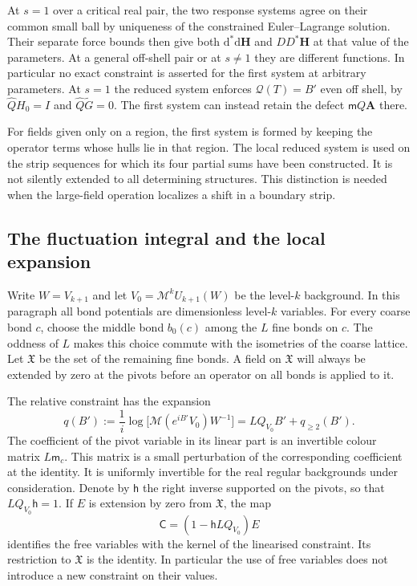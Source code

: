 \documentclass[11pt,letterpaper,reqno]{amsart}
\theoremstyle{definition}
\theoremstyle{remark}
\begin{document}
At $s=1$ over a critical real pair,
the two response systems agree on
their common small ball by uniqueness
of the constrained Euler--Lagrange
solution. Their separate force bounds
then give both $\mathrm d^*\mathrm d\mathbf H$ and
$DD^*\mathbf H$ at that value of the
parameters. At a general off-shell
pair or at $s\ne1$ they are different
functions. In particular no exact
constraint is asserted for the first
system at arbitrary parameters.
At $s=1$ the reduced system enforces
$\mathcal Q(T)=B'$ even off shell,
by $\widehat QH_0=I$ and
$\widehat Q\widetilde G=0$. The
first system can instead retain the
defect $\mathsf mQ\mathbf A$ there.

For fields given only on a region,
the first system is formed by keeping
the operator terms whose hulls lie
in that region. The local reduced
system is used on the strip sequences
for which its four partial sums
have been constructed. It is not
silently extended to all determining
structures. This distinction is
needed when the large-field operation
localizes a shift in a boundary strip.

\subsection{The fluctuation integral and the local expansion}

Write $W=V_{k+1}$ and let $V_0=\mathcal M^kU_{k+1}(W)$ be the
level-$k$ background. In this paragraph all bond potentials are
dimensionless level-$k$ variables. For every coarse bond $c$, choose
the middle bond $b_0(c)$ among the $L$ fine bonds on $c$. The oddness
of $L$ makes this choice commute with the isometries of the coarse
lattice. Let $\mathfrak X$ be the set of the remaining fine bonds.
A field on $\mathfrak X$ will always be extended by zero at the
pivots before an operator on all bonds is applied to it.

The relative constraint has the expansion
\[
 q(B'):=\frac1i\log\big[\mathcal M(e^{iB'}V_0)W^{-1}\big]
       =LQ_{V_0}B'+q_{\ge2}(B').
\]
The coefficient of the pivot variable in its linear part is an
invertible colour matrix $L\mathsf m_c$. This matrix is a small
perturbation of the corresponding coefficient at the identity.
It is uniformly invertible for the real regular backgrounds under
consideration. Denote by $\mathsf h$ the right inverse supported
on the pivots, so that $LQ_{V_0}\mathsf h=1$. If $E$ is extension
by zero from $\mathfrak X$, the map
\[
 \mathsf C=(1-\mathsf hLQ_{V_0})E
\]
identifies the free variables with the kernel of the linearised
constraint. Its restriction to $\mathfrak X$ is the identity.
In particular the use of free variables does not introduce a new
constraint on their values.
\end{document}
